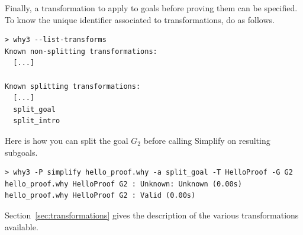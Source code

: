 Finally, a transformation to apply to goals before proving them can be
specified. To know the unique identifier associated to
transformations, do as follows.
\begin{verbatim}
> why3 --list-transforms
Known non-splitting transformations:
  [...]

Known splitting transformations:
  [...]
  split_goal
  split_intro
\end{verbatim}
Here is how you can split the goal $G_2$ before calling
Simplify on resulting subgoals.
\begin{verbatim}
> why3 -P simplify hello_proof.why -a split_goal -T HelloProof -G G2
hello_proof.why HelloProof G2 : Unknown: Unknown (0.00s)
hello_proof.why HelloProof G2 : Valid (0.00s)
\end{verbatim}
Section~\ref{sec:transformations} gives the description of the various
transformations available.



